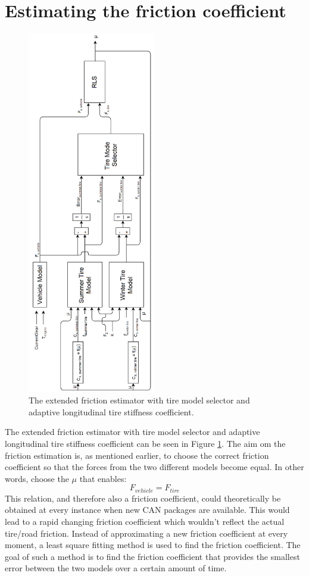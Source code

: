 \section{Estimating the friction coefficient}
\begin{figure}[!]
	\centering
	\includegraphics[width=0.5\textwidth]{Pictures/friction_estimator_ext}
	\caption {The extended friction estimator with tire model selector and adaptive longitudinal tire stiffness coefficient.}
	\label{friction_estimator_ext}
\end{figure}
The extended friction estimator with tire model selector and adaptive longitudinal tire stiffness coefficient can be seen in Figure \ref{friction_estimator_ext}. The aim om the friction estimation is, as mentioned earlier, to choose the correct friction coefficient so that the forces from the two different models become equal. In other words, choose the $ \mu $ that enables:
\begin{equation}
	F_{vehicle} = F_{tire}
\end{equation}
This relation, and therefore also a friction coefficient, could theoretically be obtained at every instance when new CAN packages are available. This would lead to a rapid changing friction coefficient which wouldn't reflect the actual tire/road friction. Instead of approximating a new friction coefficient at every moment, a least square fitting method is used to find the friction coefficient. The goal of such a method is to find the friction coefficient that provides the smallest error between the two models over a certain amount of time. 

